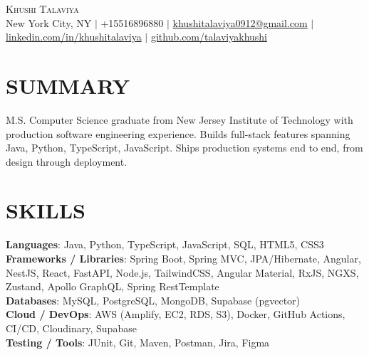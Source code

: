 \documentclass[letterpaper,11pt]{article}
\begin{document}
\begin{center}
    {\Huge \scshape Khushi Talaviya} \\ \vspace{2pt}
    \vspace{4pt}
    \small
    New York City, NY $|$
    \small
    +15516896880 $|$
    \href{mailto:khushitalaviya0912@gmail.com}{khushitalaviya0912@gmail.com} $|$
    \href{https://www.linkedin.com/in/khushitalaviya/}{linkedin.com/in/khushitalaviya} $|$
    \href{https://github.com/talaviyakhushi}{github.com/talaviyakhushi}
\end{center}

\section{SUMMARY}
\vspace{5pt}
\small{M.S. Computer Science graduate from New Jersey Institute of Technology with production software engineering experience. Builds full-stack features spanning Java, Python, TypeScript, JavaScript. Ships production systems end to end, from design through deployment.}

\vspace{2pt}
\section{SKILLS}
\vspace{5pt}
\begin{itemize}[leftmargin=0in, label={}]
\small{\item{
\textbf{Languages}{: Java, Python, TypeScript, JavaScript, SQL, HTML5, CSS3} \\
\textbf{Frameworks / Libraries}{: Spring Boot, Spring MVC, JPA/Hibernate, Angular, NestJS, React, FastAPI, Node.js, TailwindCSS, Angular Material, RxJS, NGXS, Zustand, Apollo GraphQL, Spring RestTemplate} \\
\textbf{Databases}{: MySQL, PostgreSQL, MongoDB, Supabase (pgvector)} \\
\textbf{Cloud / DevOps}{: AWS (Amplify, EC2, RDS, S3), Docker, GitHub Actions, CI/CD, Cloudinary, Supabase} \\
\textbf{Testing / Tools}{: JUnit, Git, Maven, Postman, Jira, Figma}
}}
\end{itemize}
\vspace{-10pt}

\end{document}
